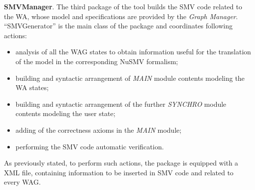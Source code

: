 \textbf{SMVManager}. The third package of the tool builds the SMV code related to the WA, whose model and \ctl specifications are provided by the \textit{Graph Manager}. ``SMVGenerator'' is the main class of the package and coordinates following actions:

\footnotesize
\begin{itemize}
	\item	analysis of all the WAG states to obtain information useful for the translation of the model in the corresponding NuSMV formalism;
	\item	building and syntactic arrangement of \textit{MAIN} module contents modeling the WA states;
	\item	building and syntactic arrangement of the further \textit{SYNCHRO} module contents modeling the user state;
	\item	adding of the correctness axioms in the \textit{MAIN} module;
	\item	performing the SMV code automatic verification.
\end{itemize}


\normalsize
As previously stated, to perform such actions, the package is equipped with a XML file, containing information to be inserted in SMV code and related to every WAG. 